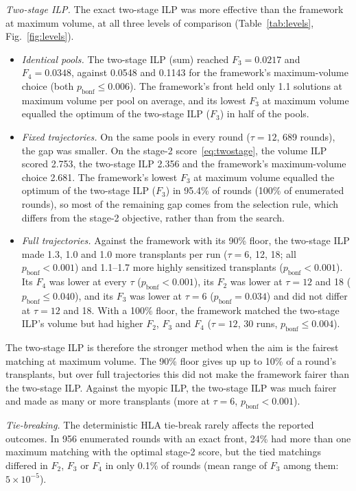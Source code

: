 \emph{Two-stage ILP.} The exact two-stage ILP was more effective than
the framework at maximum volume, at all three levels of comparison
(Table~\ref{tab:levels}, Fig.~\ref{fig:levels}).
\begin{itemize}
  \item \emph{Identical pools.} The two-stage ILP (sum) reached
    $F_3 = 0.0217$ and $F_4 = 0.0348$, against 0.0548 and 0.1143 for
    the framework's maximum-volume choice (both
    $p_{\mathrm{bonf}} \leq 0.006$). The framework's front held only
    1.1 solutions at maximum volume per pool on average, and its
    lowest $F_3$ at maximum volume equalled the optimum of the
    two-stage ILP ($F_3$) in half of the pools.
  \item \emph{Fixed trajectories.} On the same pools in every round
    ($\tau = 12$, 689 rounds), the gap was smaller. On the stage-2
    score~\eqref{eq:twostage}, the volume ILP scored 2.753, the
    two-stage ILP 2.356 and the framework's maximum-volume choice
    2.681. The framework's lowest $F_3$ at maximum volume equalled the
    optimum of the two-stage ILP ($F_3$) in 95.4\% of rounds (100\% of
    enumerated rounds), so
    most of the remaining gap comes from the selection rule, which
    differs from the stage-2 objective, rather than from the search.
  \item \emph{Full trajectories.} Against the framework with its 90\%
    floor, the two-stage ILP made 1.3, 1.0 and 1.0 more transplants
    per run ($\tau = 6$, 12, 18; all $p_{\mathrm{bonf}} < 0.001$) and
    1.1--1.7 more highly sensitized transplants
    ($p_{\mathrm{bonf}} < 0.001$). Its $F_4$ was lower at every $\tau$
    ($p_{\mathrm{bonf}} < 0.001$), its $F_2$ was lower at $\tau = 12$
    and 18 ($p_{\mathrm{bonf}} \leq 0.040$), and its $F_3$ was lower at
    $\tau = 6$ ($p_{\mathrm{bonf}} = 0.034$) and did not differ at
    $\tau = 12$ and 18. With a 100\% floor, the framework matched the
    two-stage ILP's volume but had higher $F_2$, $F_3$ and $F_4$
    ($\tau = 12$, 30 runs, $p_{\mathrm{bonf}} \leq 0.004$).
\end{itemize}
The two-stage ILP is therefore the stronger method when the aim is
the fairest matching at maximum volume. The 90\% floor gives up up to
10\% of a round's transplants, but over full trajectories this did not
make the framework fairer than the two-stage ILP. Against the myopic
ILP, the two-stage ILP was much fairer and made as many or more
transplants (more at $\tau = 6$, $p_{\mathrm{bonf}} < 0.001$).

\emph{Tie-breaking.} The deterministic HLA tie-break rarely affects the
reported outcomes. In 956 enumerated rounds with an exact front,
24\% had more than one maximum matching with the optimal stage-2
score, but the tied matchings differed in $F_2$, $F_3$ or $F_4$ in only
0.1\% of rounds (mean range of $F_3$ among them: $5 \times 10^{-5}$).


